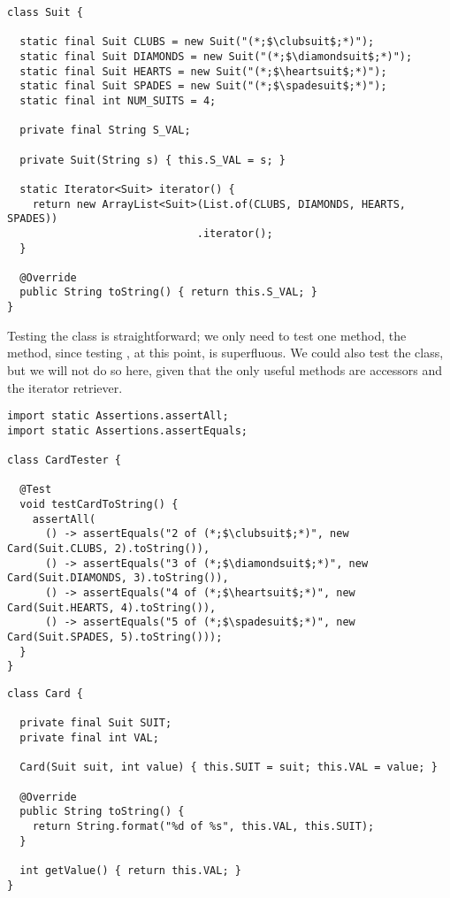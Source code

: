 \begin{lstlisting}[language=MyJava]
class Suit {

  static final Suit CLUBS = new Suit("(*;$\clubsuit$;*)");
  static final Suit DIAMONDS = new Suit("(*;$\diamondsuit$;*)");
  static final Suit HEARTS = new Suit("(*;$\heartsuit$;*)");
  static final Suit SPADES = new Suit("(*;$\spadesuit$;*)");
  static final int NUM_SUITS = 4;

  private final String S_VAL;

  private Suit(String s) { this.S_VAL = s; }

  static Iterator<Suit> iterator() {
    return new ArrayList<Suit>(List.of(CLUBS, DIAMONDS, HEARTS, SPADES))
                              .iterator();
  }

  @Override
  public String toString() { return this.S_VAL; }
}
\end{lstlisting}

Testing the  class is straightforward; we only need to test one method, the  method, since testing , at this point, is superfluous. 
We could also test the  class, but we will not do so here, given that the only useful methods are accessors and the iterator retriever.

\begin{lstlisting}[language=MyJava]
import static Assertions.assertAll;
import static Assertions.assertEquals;

class CardTester {

  @Test
  void testCardToString() {
    assertAll(
      () -> assertEquals("2 of (*;$\clubsuit$;*)", new Card(Suit.CLUBS, 2).toString()),
      () -> assertEquals("3 of (*;$\diamondsuit$;*)", new Card(Suit.DIAMONDS, 3).toString()),
      () -> assertEquals("4 of (*;$\heartsuit$;*)", new Card(Suit.HEARTS, 4).toString()),
      () -> assertEquals("5 of (*;$\spadesuit$;*)", new Card(Suit.SPADES, 5).toString()));
  }
}
\end{lstlisting}

\begin{lstlisting}[language=MyJava]
class Card {

  private final Suit SUIT;
  private final int VAL;

  Card(Suit suit, int value) { this.SUIT = suit; this.VAL = value; }
  
  @Override
  public String toString() { 
    return String.format("%d of %s", this.VAL, this.SUIT); 
  }

  int getValue() { return this.VAL; } 
}
\end{lstlisting}

